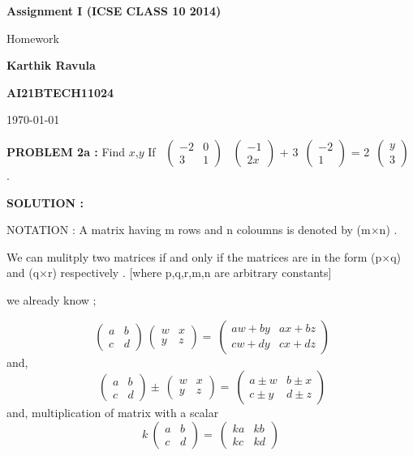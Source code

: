 \documentclass[journal,12pt,twocolumn]{IEEEtran}
\theoremstyle{remark}
\newcommand{\myvec}[1]{\ensuremath{\begin{pmatrix}#1\end{pmatrix}}}
\numberwithin{equation}{subsection}
\begin{document}
\begin{titlepage}
    \begin{center}
    
       \vspace*{2cm}
        \huge
        \textbf{Assignment I (ICSE CLASS 10 2014)}
        \vspace{2cm}
        \large
        
        Homework  
        \vspace{1.5cm}
        \Large   
               
        \textbf{Karthik Ravula}
        
        \vspace{0.5cm}      
        \large
            \textbf{AI21BTECH11024}     
            
            
               
       \vspace{4cm}
        \large
        \today
    \end{center}
\end{titlepage}
\newpage
\textbf{PROBLEM 2a :} 
  Find \hspace{0.05cm}$x$,$ y $ \hspace{0.25cm}       
       If \ \myvec{-2 & 0\\3 & 1} \hspace{-0.5cm}
\ \myvec{-1\\2x}  
 + 3\ \myvec{-2 \\1 } 
 = 2\ \myvec{y \\3 } .

  \bigskip
  \textbf{SOLUTION : }  
  
  {NOTATION : } A matrix having m rows and n coloumns is denoted by (m$\times$n) .
  
  We can mulitply two matrices if and only if the matrices are in the form (p$\times$q) and (q$\times$r) respectively .
   [where p,q,r,m,n are arbitrary constants]
   
  we already know ;
    
    \begin{equation}
       \ \myvec{a & b \\c & d } 
      \ \myvec{w & x \\y & z } 
      =
       \ \myvec{aw+ by & ax+ bz \\cw+ dy& cx+ dz} 
    \end{equation}
    and,
    \begin{equation}
      \ \myvec{a & b \\c & d } 
      \pm
      \ \myvec{w & x \\y & z } 
      =
       \ \myvec{a\pm w & b\pm x \\c\pm y& d\pm z} 
    \end{equation}
    and,
    multiplication of matrix with a scalar
    \begin{equation}
     k \ \myvec{a & b \\c & d } 
      =
       \ \myvec{ka & kb \\kc & kd } 
    \end{equation}
    
\end{document}
